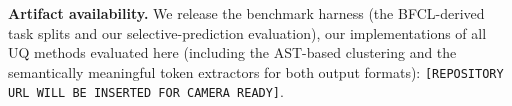 \textbf{Artifact availability.} We release the benchmark harness (the BFCL-derived task splits and our selective-prediction evaluation), our implementations of all UQ methods evaluated here (including the AST-based clustering and the semantically meaningful token extractors for both output formats): \texttt{[REPOSITORY URL WILL BE INSERTED FOR CAMERA READY]}.

